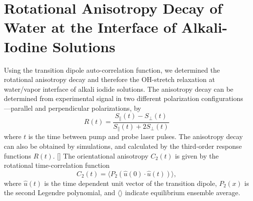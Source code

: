 \section{Rotational Anisotropy Decay of Water at the Interface of Alkali-Iodine Solutions}\label{CHAPETR_AD}
Using the transition dipole auto-correlation function, 
we determined the rotational anisotropy decay and therefore the OH-stretch relaxation at water/vapor interface of alkali iodide solutions.
The anisotropy decay can be determined from experimental signal in two different polarization configurations---parallel and perpendicular polarizations, by 
\begin{equation}
        R(t)=\frac{S_{\parallel}(t)-S_{\perp}(t)}{S_{\parallel}(t)+2S_{\perp}(t)}
\label{eq:ad}
\end{equation}
where $t$ is the time between pump and probe laser pulses.  The anisotropy decay can also be obtained by simulations, and calculated by the third-order response functions $R(t)$. [\cite{Jansen10,Jansen06}]
%
%
The orientational anisotropy $C_2(t)$ is given by the rotational time-correlation function 
\begin{equation}
C_2(t)=\langle P_2(\hat{u}(0)\cdot\hat{u}(t)) \rangle,
\label{eq:tcf2}
\end{equation}
where $\hat{u}(t)$ is the time dependent unit vector of the transition dipole, $P_2(x)$ is the second Legendre polynomial, and $\langle \rangle$ indicate 
equilibrium ensemble average.\cite{Corcelli05,LinYS2010} %

